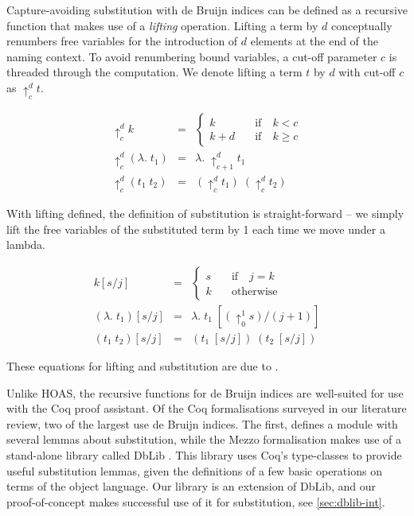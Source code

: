 \documentclass[]{unswthesis}
\newcommand{\SSPHS}{\text{SSPHS }}
\let\i\textit
\begin{document}
Capture-avoiding substitution with de Bruijn indices can be defined as a recursive function that makes use of a \i{lifting} operation. Lifting a term by $d$ conceptually renumbers free variables for the introduction of $d$ elements at the end of the naming context. To avoid renumbering bound variables, a cut-off parameter $c$ is threaded through the computation. We denote lifting a term $t$ by $d$ with cut-off $c$ as $\uparrow^d_c t$.

\begin{eqnarray*}
\uparrow^d_c k & = &
  \begin{cases}
  k \quad & \text{if} \quad k < c \\
  k + d \quad & \text{if} \quad k \geq c
  \end{cases}\\
\uparrow^d_c (\lambda. \; t_1) & = & \lambda. \; \uparrow^d_{c + 1} t_1\\
\uparrow^d_c (t_1 \; t_2) & = & (\uparrow^d_c t_1) \; (\uparrow^d_c t_2)
\end{eqnarray*}

With lifting defined, the definition of substitution is straight-forward -- we simply lift the free variables of the substituted term by 1 each time we move under a lambda.

\begin{eqnarray*}
k[s/j] & = &
  \begin{cases}
  s \quad & \text{if} \quad j = k \\
  k \quad & \text{otherwise}
  \end{cases}\\
(\lambda. \; t_1)\left[s/j\right] & = & \lambda. \; t_1 \; [(\uparrow^1_0 s)/(j + 1)]\\
(t_1 \; t_2)\left[s/j\right] & = & (t_1 \; [s/j]) \; (t_2 \; [s/j])
\end{eqnarray*}

These equations for lifting and substitution are due to \cite{tapl}.

Unlike HOAS, the recursive functions for de Bruijn indices are well-suited for use with the Coq proof assistant. Of the Coq formalisations surveyed in our literature review, two of the largest use de Bruijn indices. The first, \SSPHS \cite{pottier13} defines a module with several lemmas about substitution, while the Mezzo formalisation \cite{mezzo14} makes use of a stand-alone library called DbLib \cite{dblib13}. This library uses Coq's type-classes to provide useful substitution lemmas, given the definitions of a few basic operations on terms of the object language. Our library is an extension of DbLib, and our proof-of-concept makes successful use of it for substitution, see \cref{sec:dblib-int}.
\end{document}
